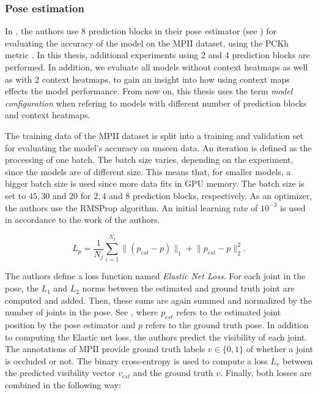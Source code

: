\subsubsection{Pose estimation}
In \cite{luvizon_2d/3d_2018}, the authors use $8$ prediction blocks in their pose estimator (see ) for evaluating the accuracy of the model on the MPII dataset, using the PCKh metric .
In this thesis, additional experiments using $2$ and $4$ prediction blocks are performed.
In addition, we evaluate all models without context heatmaps as well as with $2$ context heatmaps, to gain an insight into how using context maps effects the model performance.
From now on, this thesis uses the term \textit{model configuration} when refering to models with different number of prediction blocks and context heatmaps.

The training data of the MPII dataset is split into a training and validation set for evaluating the model's accuracy on unseen data.
An iteration is defined as the processing of one batch.
The batch size varies, depending on the experiment, since the models are of different size.
This means that, for smaller models, a bigger batch size is used since more data fits in GPU memory.
The batch size is set to $45, 30$ and $20$ for $2, 4$ and $8$ prediction blocks, respectively.
As an optimizer, the authors use the RMSProp algorithm.
An initial learning rate of $10^{-3}$ is used in accordance to the work of the authors.

\begin{equation}
    \label{eq:elasticnetloss}
    L_p = \frac{1}{N_j} \sum_{i=1}^{N_j} \lVert(p_{est} - p)\rVert_1 + \lVert p_{est} - p \rVert^2_2.
\end{equation}

The authors define a loss function named \textit{Elastic Net Loss}.
For each joint in the pose, the $L_1$ and $L_2$ norms between the estimated and ground truth joint are computed and added.
Then, these sums are again summed and normalized by the number of joints in the pose.
See , where $p_{est}$ refers to the estimated joint position by the pose estimator and $p$ refers to the ground truth pose.
In addition to computing the Elastic net loss, the authors predict the visibility of each joint.
The annotations of MPII provide ground truth labels $v \in \{0,1\}$ of whether a joint is occluded or not.
The binary cross-entropy is used to compute a loss $L_v$ between the predicted visibility vector $v_{est}$ and the ground truth $v$.
Finally, both losses are combined in the following way:

